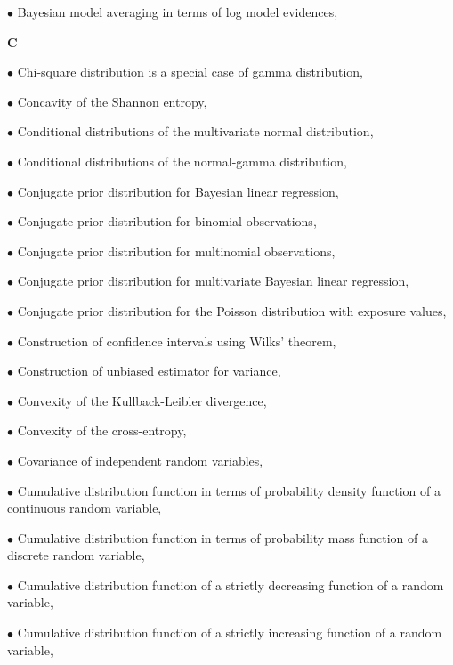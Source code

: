 \documentclass[a4paper,12pt,twoside]{book}
\begin{document}
$\bullet$ Bayesian model averaging in terms of log model evidences, \pageref{sec:bma-lme}


\vspace{1em}
\textbf{C}

$\bullet$ Chi-square distribution is a special case of gamma distribution, \pageref{sec:chi2-gam}

$\bullet$ Concavity of the Shannon entropy, \pageref{sec:ent-conc}

$\bullet$ Conditional distributions of the multivariate normal distribution, \pageref{sec:mvn-cond}

$\bullet$ Conditional distributions of the normal-gamma distribution, \pageref{sec:ng-cond}

$\bullet$ Conjugate prior distribution for Bayesian linear regression, \pageref{sec:blr-prior}

$\bullet$ Conjugate prior distribution for binomial observations, \pageref{sec:bin-prior}

$\bullet$ Conjugate prior distribution for multinomial observations, \pageref{sec:mult-prior}

$\bullet$ Conjugate prior distribution for multivariate Bayesian linear regression, \pageref{sec:mblr-prior}

$\bullet$ Conjugate prior distribution for the Poisson distribution with exposure values, \pageref{sec:poissexp-prior}

$\bullet$ Construction of confidence intervals using Wilks' theorem, \pageref{sec:ci-wilks}

$\bullet$ Construction of unbiased estimator for variance, \pageref{sec:resvar-unb}

$\bullet$ Convexity of the Kullback-Leibler divergence, \pageref{sec:kl-conv}

$\bullet$ Convexity of the cross-entropy, \pageref{sec:entcross-conv}

$\bullet$ Covariance of independent random variables, \pageref{sec:cov-ind}

$\bullet$ Cumulative distribution function in terms of probability density function of a continuous random variable, \pageref{sec:cdf-pdf}

$\bullet$ Cumulative distribution function in terms of probability mass function of a discrete random variable, \pageref{sec:cdf-pmf}

$\bullet$ Cumulative distribution function of a strictly decreasing function of a random variable, \pageref{sec:cdf-sdfct}

$\bullet$ Cumulative distribution function of a strictly increasing function of a random variable, \pageref{sec:cdf-sifct}
\end{document}
